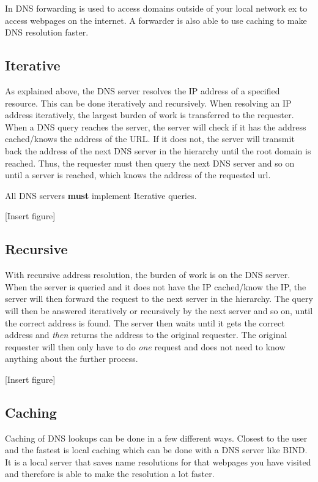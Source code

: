 In DNS forwarding is used to access domains outside of your local network ex to access webpages on the internet. A forwarder is also able to use caching to make DNS resolution faster.
\subsection{Iterative}
As explained above, the DNS server resolves the IP address of a specified resource. This can be done iteratively and recursively.
When resolving an IP address iteratively, the largest burden of work is transferred to the requester. 
When a DNS query reaches the server, the server will check if it has the address cached/knows the address of the URL. If it does not, the server will transmit back the address of the next DNS server in the hierarchy until the root domain is reached.
Thus, the requester must then query the next DNS server and so on until a server is reached, which knows the address of the requested url.

All DNS servers \textbf{must} implement Iterative queries.

[Insert figure]

\subsection{Recursive}
With recursive address resolution, the burden of work is on the DNS server. When the server is queried and it does not have the IP cached/know the IP, the server will then forward the request to the next server in the hierarchy. The query will then be answered iteratively or recursively by the next server and so on, until the correct address is found.
The server then waits until it gets the correct address and \textit{then} returns the address to the original requester. The original requester will then only have to do \textit{one} request and does not need to know anything about the further process. 

[Insert figure]

\subsection{Caching}
Caching of DNS lookups can be done in a few different ways. Closest to the user and the fastest is local caching which can be done with a DNS server like BIND. It is a local server that saves name resolutions for that webpages you have visited and therefore is able to make the resolution a lot faster.

